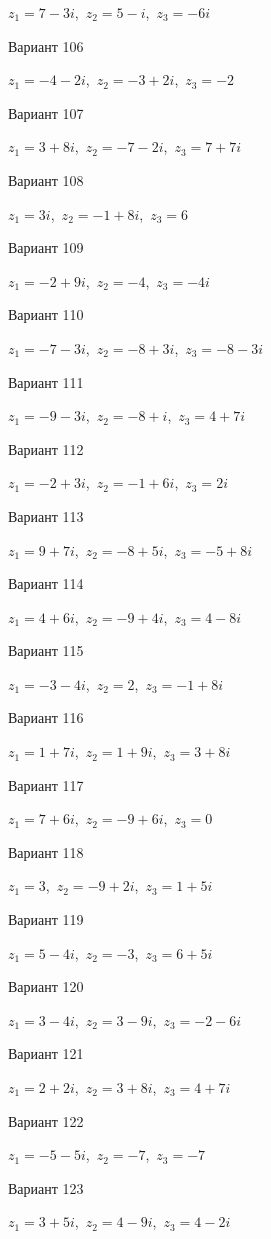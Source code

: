 \documentclass[11pt]{report}
\begin{document}
$z_1 = 7 - 3 i$,\ $z_2 = 5 - i$,\ $z_3 = - 6 i$

Вариант 106

$z_1 = -4 - 2 i$,\ $z_2 = -3 + 2 i$,\ $z_3 = -2$

Вариант 107

$z_1 = 3 + 8 i$,\ $z_2 = -7 - 2 i$,\ $z_3 = 7 + 7 i$

Вариант 108

$z_1 = 3 i$,\ $z_2 = -1 + 8 i$,\ $z_3 = 6$

Вариант 109

$z_1 = -2 + 9 i$,\ $z_2 = -4$,\ $z_3 = - 4 i$

Вариант 110

$z_1 = -7 - 3 i$,\ $z_2 = -8 + 3 i$,\ $z_3 = -8 - 3 i$

Вариант 111

$z_1 = -9 - 3 i$,\ $z_2 = -8 + i$,\ $z_3 = 4 + 7 i$

Вариант 112

$z_1 = -2 + 3 i$,\ $z_2 = -1 + 6 i$,\ $z_3 = 2 i$

Вариант 113

$z_1 = 9 + 7 i$,\ $z_2 = -8 + 5 i$,\ $z_3 = -5 + 8 i$

Вариант 114

$z_1 = 4 + 6 i$,\ $z_2 = -9 + 4 i$,\ $z_3 = 4 - 8 i$

Вариант 115

$z_1 = -3 - 4 i$,\ $z_2 = 2$,\ $z_3 = -1 + 8 i$

Вариант 116

$z_1 = 1 + 7 i$,\ $z_2 = 1 + 9 i$,\ $z_3 = 3 + 8 i$

Вариант 117

$z_1 = 7 + 6 i$,\ $z_2 = -9 + 6 i$,\ $z_3 = 0$

Вариант 118

$z_1 = 3$,\ $z_2 = -9 + 2 i$,\ $z_3 = 1 + 5 i$

Вариант 119

$z_1 = 5 - 4 i$,\ $z_2 = -3$,\ $z_3 = 6 + 5 i$

Вариант 120

$z_1 = 3 - 4 i$,\ $z_2 = 3 - 9 i$,\ $z_3 = -2 - 6 i$

Вариант 121

$z_1 = 2 + 2 i$,\ $z_2 = 3 + 8 i$,\ $z_3 = 4 + 7 i$

Вариант 122

$z_1 = -5 - 5 i$,\ $z_2 = -7$,\ $z_3 = -7$

Вариант 123

$z_1 = 3 + 5 i$,\ $z_2 = 4 - 9 i$,\ $z_3 = 4 - 2 i$
\end{document}
